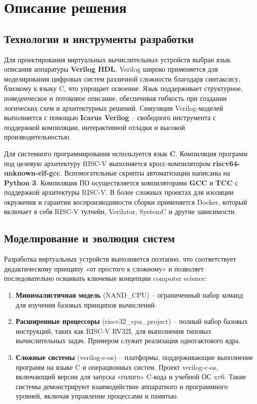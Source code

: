 

\section{Описание решения}


\subsection{Технологии и инструменты разработки}

Для проектирования виртуальных вычислительных устройств выбран язык описания аппаратуры \textbf{Verilog HDL}. Verilog широко применяется для моделирования цифровых систем различной сложности благодаря синтаксису, близкому к языку C, что упрощает освоение. Язык поддерживает структурное, поведенческое и потоковое описание, обеспечивая гибкость при создании логических схем и архитектурных решений. Симуляция Verilog-моделей выполняется с помощью \textbf{Icarus Verilog} -- свободного инструмента с поддержкой компиляции, интерактивной отладки и высокой производительностью. 

Для системного программирования используется язык \textbf{C}. Компиляция программ под целевую архитектуру RISC-V выполняется кросс-компилятором \textbf{riscv64-unknown-elf-gcc}. Вспомогательные скрипты автоматизации написаны на \textbf{Python 3}. Компиляция ПО осуществляется компиляторами \textbf{GCC} и \textbf{TCC} с поддержкой архитектуры RISC-V. В более сложных проектах для изоляции окружения и гарантии воспроизводимости сборки применяется Docker, который включает в себя RISC-V тулчейн, Verilator, SystemC и другие зависимости.

\subsection{Моделирование и эволюция систем}

Разработка виртуальных устройств выполняется поэтапно, что соответствует дидактическому принципу «от простого к сложному» и позволяет последовательно осваивать ключевые концепции computer science:

\begin{enumerate}
  \item \textbf{Минималистичная модель} (NAND\_CPU) -- ограниченный набор команд для изучения базовых принципов вычислений.
  \item \textbf{Расширенные процессоры} (riscv32\_cpu\_project) -- полный набор базовых инструкций, таких как RISC-V RV32I, для выполнения типовых вычислительных задач. Примером служит реализация однотактового ядра.
  \item \textbf{Сложные системы} (verilog-c-os) -- платформы, поддерживающие выполнение программ на языке C и операционных систем. Проект verilog-c-os, включающий версии для запуска «голого» C-кода и учебной ОС xv6. Такие системы демонстрируют взаимодействие аппаратного и программного уровней, включая управление процессами и памятью.
\end{enumerate}

